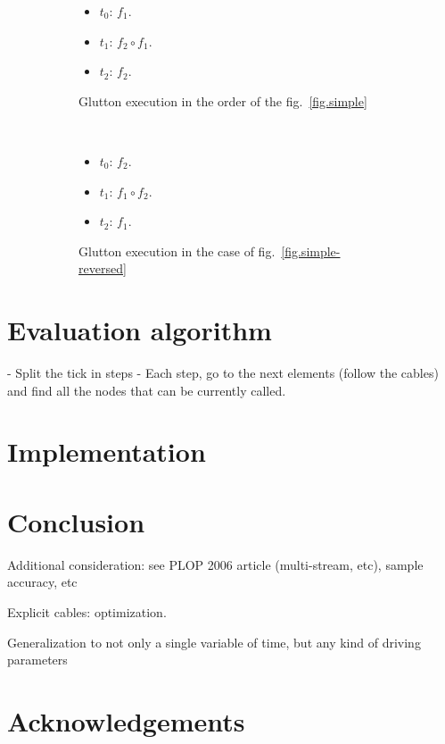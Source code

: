 \documentclass{article}
\begin{document}
    
\begin{figure}
  \begin{subfigure}{0.20\textwidth }    		    		
    \begin{itemize}
      \item $t_0$: $f_1$.
      \item $t_1$: $f_2 \circ f_1$.
      \item $t_2$: $f_2$. 
    \end{itemize}
    \caption{Glutton execution in the order of the fig.~\ref{fig.simple}}
  \end{subfigure}~
  \begin{subfigure}{0.20\textwidth}
    		    	
    \begin{itemize}
      \item $t_0$: $f_2$.
      \item $t_1$: $f_1 \circ f_2$.
      \item $t_2$: $f_1$. 
    \end{itemize}
    \caption{
    	Glutton execution in the case of fig.~\ref{fig.simple-reversed}}
  \end{subfigure}
  \caption{}
\end{figure}
    
\section{Evaluation algorithm}
- Split the tick in steps
- Each step, go to the next elements (follow the cables) and find all the nodes that can be currently called.
    
    
\section{Implementation}
\section{Conclusion}
Additional consideration: see PLOP 2006 article (multi-stream, etc), sample accuracy, etc
    
Explicit cables: optimization.

Generalization to not only a single variable of time, but any kind of driving parameters
\section{Acknowledgements}
\printbibliography 
\end{document}
